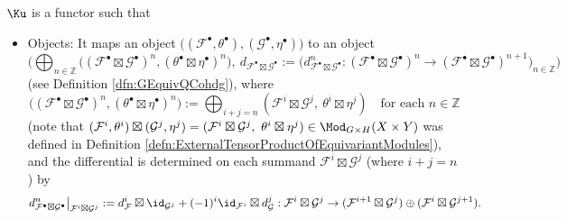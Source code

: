 \begin{defn}
$\Ku$ is a functor such that
\begin{itemize}
\item
Objects:
It maps an object
$
\big((\mathcal{F}^{\bullet},\theta^{\bullet}),(\mathcal{G}^{\bullet},\eta^{\bullet})\big)
$
to an object
$$
\Big(
\bigoplus_{n\in\mathbb{Z}}
\big(
(\mathcal{F}^{\bullet}\boxtimes\mathcal{G}^{\bullet})^n,
(\theta^{\bullet}\boxtimes\eta^{\bullet})^n
\big),
\
d_{\mathcal{F}^{\bullet}\boxtimes\mathcal{G}^{\bullet}}
:=
\big(
d_{\mathcal{F}^{\bullet}\boxtimes\mathcal{G}^{\bullet}}^n
:
(\mathcal{F}^{\bullet}\boxtimes\mathcal{G}^{\bullet})^n
\rightarrow
(\mathcal{F}^{\bullet}\boxtimes\mathcal{G}^{\bullet})^{n+1}
\big)_{n\in\mathbb{Z}}
\Big)
$$
(see Definition \ref{dfn:GEquivQCohdg}),
where
$$
\big(
(\mathcal{F}^{\bullet}\boxtimes\mathcal{G}^{\bullet})^n,
(\theta^{\bullet}\boxtimes\eta^{\bullet})^n
\big)
:=
\bigoplus_{i+j=n}
(
\mathcal{F}^i\boxtimes\mathcal{G}^j,
\
\theta^i\boxtimes\eta^j
)
\quad\text{for each $n\in\mathbb{Z}$}
$$
(note that
$
(\mathcal{F}^i,\theta^i)
\boxtimes
(\mathcal{G}^j,\eta^j)
=
(
\mathcal{F}^i\boxtimes\mathcal{G}^j,
\
\theta^i\boxtimes\eta^j
)
\in\Mod_{G\times H}(X\times Y)
$
was defined in
Definition \ref{defn:ExternalTensorProductOfEquivariantModules}),
and
the differential is determined on each summand
$\mathcal{F}^i\boxtimes\mathcal{G}^j$
(where $i+j=n$)
by
\[
d_{\mathcal F^\bullet\boxtimes\mathcal G^\bullet}^n
\big|_{\mathcal F^i\boxtimes\mathcal G^j}
:=
d_{\mathcal F}^i\boxtimes\id_{\mathcal G^j}
+
(-1)^i\id_{\mathcal F^i}\boxtimes d_{\mathcal G}^j
:
\mathcal{F}^i\boxtimes\mathcal{G}^j
\rightarrow
(\mathcal{F}^{i+1}\boxtimes\mathcal{G}^j)
\oplus
(\mathcal{F}^i\boxtimes\mathcal{G}^{j+1}).
\]


\end{itemize}
\end{defn}
